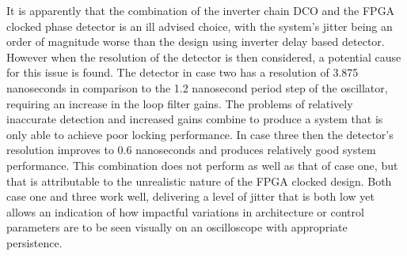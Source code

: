 \documentclass[conference]{IEEEtran}
\begin{document}
It is apparently that the combination of the inverter chain DCO and the FPGA clocked phase detector is an ill advised choice, with the system's jitter being an order of magnitude worse than the design using inverter delay based detector. However when the resolution of the detector is then considered, a potential cause for this issue is found. The detector in case two has a resolution of 3.875 nanoseconds in comparison to the 1.2 nanosecond period step of the oscillator, requiring an increase in the loop filter gains. The problems of relatively inaccurate detection and increased gains combine to produce a system that is only able to achieve poor locking performance. In case three then the detector's resolution improves to 0.6 nanoseconds and produces relatively good system performance. This combination does not perform as well as that of case one, but that is attributable to the unrealistic nature of the FPGA clocked design. Both case one and three work well, delivering a level of jitter that is both low yet allows an indication of how impactful variations in architecture or control parameters are to be seen visually on an oscilloscope with appropriate persistence.\\


\end{document}
